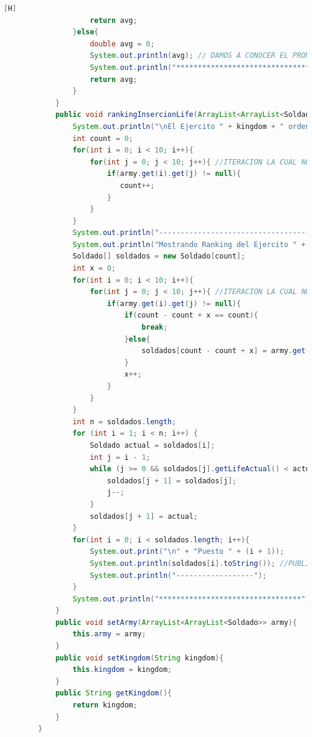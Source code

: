 \documentclass{article}
\begin{document}
\begin{lstlisting}[language=java,caption={Las lineas de codigos de la clase Ejercito creada:}][H]
					return avg;
				}else{
					double avg = 0;
					System.out.println(avg); // DAMOS A CONOCER EL PROMEDIO DE VIDA DE CADA EJERCITO 
					System.out.println("*********************************");
					return avg;
				}
			}
			public void rankingInsercionLife(ArrayList<ArrayList<Soldado>> army , String kingdom){
				System.out.println("\nEl Ejercito " + kingdom + " ordenando por metodo insercion: ");
				int count = 0;
				for(int i = 0; i < 10; i++){
					for(int j = 0; j < 10; j++){ //ITERACION LA CUAL NOS AYUDA A PASAR POR TODOS LOS SOLDADOS DE CADA EJERCITO
						if(army.get(i).get(j) != null){ 
						   count++;
						}
					}
				}
				System.out.println("------------------------------------------");
				System.out.println("Mostrando Ranking del Ejercito " + kingdom + " ..... ////// --->");
				Soldado[] soldados = new Soldado[count];
				int x = 0;
				for(int i = 0; i < 10; i++){
					for(int j = 0; j < 10; j++){ //ITERACION LA CUAL NOS AYUDA A PASAR POR TODOS LOS SOLDADOS AL ARRAY SOLDADO PARA PODER USAR EL USO DEL METODO DE ORDENACION INSERCION
						if(army.get(i).get(j) != null){ 
							if(count - count + x == count){
								break;
							}else{
								soldados[count - count + x] = army.get(i).get(j); //LA MISMA LOGICA QUE EL ANTERIOR METODO SOLO QUE EN ESTE LO USARIAMOS DE MANERA DIFERENTE YA QUE ESTE SERIA DE FORMA DE INSERCION
							}
							x++;   
						}
					}
				}
				int n = soldados.length;
				for (int i = 1; i < n; i++) {
					Soldado actual = soldados[i];
					int j = i - 1;
					while (j >= 0 && soldados[j].getLifeActual() < actual.getLifeActual()) { //ORDENAMOS EL EJERCITO RESPECTIVAMENTE MEDIANTE EL METODO QUE NOS OFRECE INSERCION EL CUAL ES ESTE CODIGO
						soldados[j + 1] = soldados[j];
						j--;
					}
					soldados[j + 1] = actual;
				}
				for(int i = 0; i < soldados.length; i++){
					System.out.print("\n" + "Puesto " + (i + 1));
					System.out.println(soldados[i].toString()); //PUBLICAMOS RESULTADOS
					System.out.println("------------------");
				}
				System.out.println("*********************************");
			}
			public void setArmy(ArrayList<ArrayList<Soldado>> army){
				this.army = army;
			}
			public void setKingdom(String kingdom){
				this.kingdom = kingdom;
			}
			public String getKingdom(){
				return kingdom;
			}
		}
	\end{lstlisting}
\end{document}
